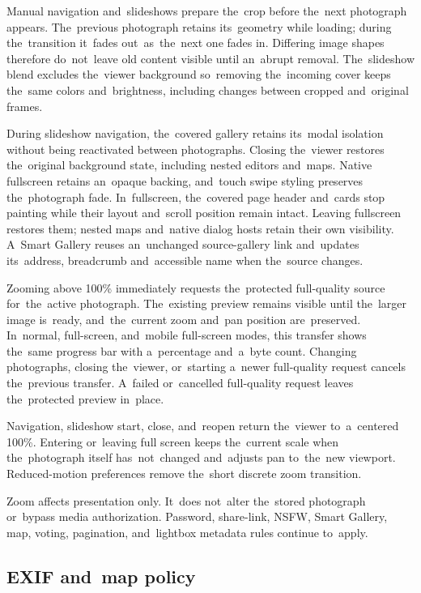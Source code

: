 \documentclass[11pt,a4paper]{article}
\begin{document}
Manual navigation and~slideshows prepare the~crop before the~next photograph
appears. The~previous photograph retains its~geometry while loading; during
the~transition it~fades out~as~the~next one fades in. Differing image shapes
therefore do~not~leave old content visible until an~abrupt removal.
The~slideshow blend excludes the~viewer background so~removing the~incoming
cover keeps
the~same colors and~brightness, including changes between cropped and~original
frames.

During slideshow navigation, the~covered gallery retains its~modal isolation
without being reactivated between photographs. Closing the~viewer restores
the~original background state, including nested editors and~maps. Native
fullscreen retains an~opaque backing, and~touch swipe styling preserves
the~photograph fade.
In~fullscreen, the~covered page header and~cards stop painting while their
layout and~scroll position remain intact. Leaving fullscreen restores them;
nested maps and~native dialog hosts retain their own visibility. A~Smart
Gallery reuses an~unchanged source-gallery link and~updates its~address,
breadcrumb and~accessible name when the~source changes.

Zooming above 100\% immediately requests the~protected full-quality source
for~the~active photograph. The~existing preview remains visible until the~larger
image is~ready, and~the~current zoom and~pan position are~preserved. In~normal,
full-screen, and~mobile full-screen modes, this transfer shows the~same progress
bar with a~percentage and~a~byte count. Changing photographs, closing
the~viewer, or~starting a~newer full-quality request cancels the~previous
transfer. A~failed or~cancelled full-quality request leaves the~protected
preview in~place.

Navigation, slideshow start, close, and~reopen return the~viewer to~a~centered
100\%. Entering or~leaving full screen keeps the~current scale when
the~photograph itself has~not~changed and~adjusts pan to~the~new viewport.
Reduced-motion preferences remove the~short discrete zoom transition.

Zoom affects presentation only. It~does not~alter the~stored photograph
or~bypass media authorization. Password, share-link, NSFW, Smart Gallery, map,
voting, pagination, and~lightbox metadata rules continue to~apply.

\subsection{EXIF and~map policy}
\end{document}
